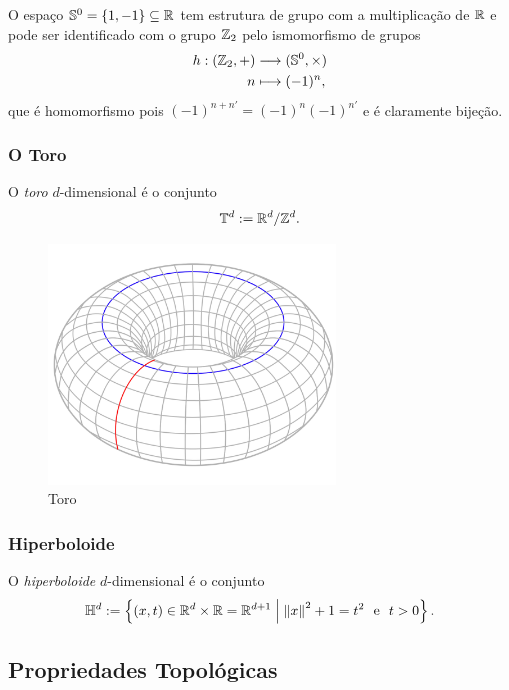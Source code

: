 O espaço $\mathbb{S}^0 = \{1,-1\} \subseteq \mathbb{R}$ tem estrutura de grupo com a multiplicação de $\mathbb{R}$ e pode ser identificado com o grupo $\mathbb{Z}_2$ pelo ismomorfismo de grupos
	\begin{align*}
	{h}: {(\mathbb{Z}_2,+)} &\longrightarrow {(\mathbb{S}^0,\times)} \\{n} &\longmapsto {(-1)^n},
	\end{align*}
que é homomorfismo pois $(-1)^{n+n'} = (-1)^n(-1)^{n'}$ e é claramente bijeção.

\subsubsection{O Toro}

\begin{defi}
	O \emph{toro} $d$-dimensional é o conjunto
	\begin{equation*}
	\mathbb{T}^d := \mathbb{R}^d / \mathbb{Z}^d.
	\end{equation*}
\end{defi}

\begin{figure}[!h]
\centering
\includegraphics[width=3in]{./imagens/toro}
\caption{Toro}
\end{figure}

\subsubsection{Hiperboloide}

\begin{defi}
O \emph{hiperboloide} $d$-dimensional é o conjunto
	\begin{equation*}
	\mathbb{H}^d := \left\{(x,t) \in \mathbb{R}^d \times \mathbb{R} = \mathbb{R}^{d+1} \;\middle\vert\; \left\Vert{x}\right\Vert^2+1=t^2 \text{\ \ e\ \ } t>0 \right\}.
	\end{equation*}
\end{defi}

\subsection{Propriedades Topológicas}

